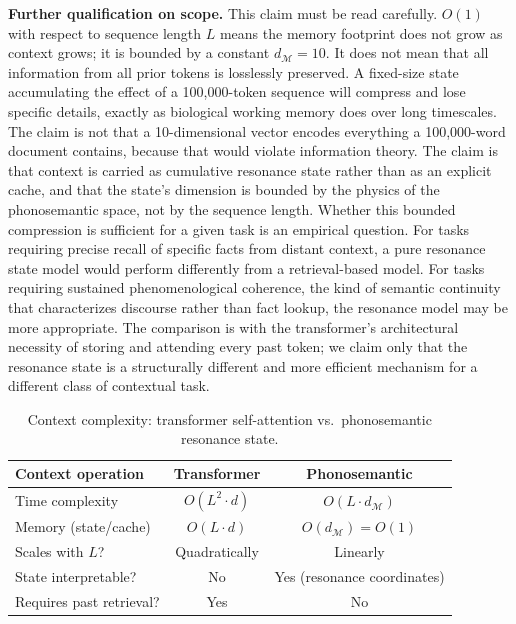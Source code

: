 \documentclass[12pt]{article}
\begin{document}
\textbf{Further qualification on scope.} This claim must be read carefully. $O(1)$ with respect to sequence length $L$ means the memory footprint does not grow as context grows; it is bounded by a constant $d_\mathcal{M} = 10$. It does not mean that all information from all prior tokens is losslessly preserved. A fixed-size state accumulating the effect of a 100,000-token sequence will compress and lose specific details, exactly as biological working memory does over long timescales. The claim is not that a 10-dimensional vector encodes everything a 100,000-word document contains, because that would violate information theory. The claim is that context is carried as cumulative resonance state rather than as an explicit cache, and that the state's dimension is bounded by the physics of the phonosemantic space, not by the sequence length. Whether this bounded compression is sufficient for a given task is an empirical question. For tasks requiring precise recall of specific facts from distant context, a pure resonance state model would perform differently from a retrieval-based model. For tasks requiring sustained phenomenological coherence, the kind of semantic continuity that characterizes discourse rather than fact lookup, the resonance model may be more appropriate. The comparison is with the transformer's architectural necessity of storing and attending every past token; we claim only that the resonance state is a structurally different and more efficient mechanism for a different class of contextual task.

\begin{table}[htbp]
\centering
\renewcommand{\arraystretch}{1.35}
\begin{tabular}{lcc}
\toprule
\textbf{Context operation} & \textbf{Transformer} & \textbf{Phonosemantic} \\
\midrule
Time complexity & $O(L^2 \cdot d)$ & $O(L \cdot d_\mathcal{M})$ \\
Memory (state/cache) & $O(L \cdot d)$ & $O(d_\mathcal{M}) = O(1)$ \\
Scales with $L$? & Quadratically & Linearly \\
State interpretable? & No & Yes (resonance coordinates) \\
Requires past retrieval? & Yes & No \\
\bottomrule
\end{tabular}
\caption{Context complexity: transformer self-attention vs.\ phonosemantic resonance state.}
\end{table}
\end{document}
